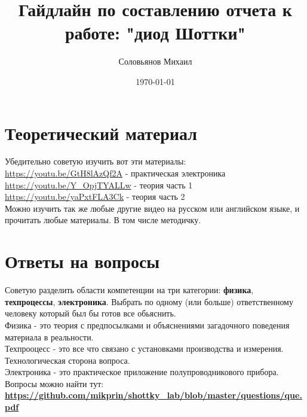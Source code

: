 \documentclass[a4paper,12pt]{article} %
\author{Соловьянов Михаил}
\title{Гайдлайн по составлению отчета к работе: "диод Шоттки"}
\date{\today}
\begin{document}
\maketitle


\section{Теоретический материал}

Убедительно советую изучить вот эти материалы:\\

\url{https://youtu.be/GtH8lAzQf2A}  - практическая электроника\\
\url{https://youtu.be/Y_OpjTYALLw} - теория часть 1\\
\url{https://youtu.be/yaPxtFLA3Ck} - теория часть 2\\

Можно изучить так же любые другие видео на русском или английском языке, и прочитать любые материалы. В том числе методичку.
\section{Ответы на вопросы}
Советую разделить области компетенции на три категории: \textbf{физика}, \textbf{техпроцессы}, \textbf{электроника}. Выбрать по одному (или больше) ответственному человеку который был бы готов все обьяснить.\\
Физика - это теория с предпосылками и объяснениями загадочного поведения материала в реальности.\\
Техпрооцесс - это все что связано с установками производства и измерения. Технологическая сторона вопроса.\\
Электроника - это практическое приложение полупроводникового прибора.\\

Вопросы можно найти тут: \textbf{\url{https://github.com/mikprin/shottky_lab/blob/master/questions/que.pdf}}
\end{document}
